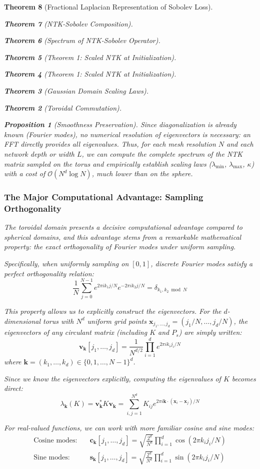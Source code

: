 \documentclass{article}
\newtheorem{theorem}{Theorem}[section]
\newtheorem{proposition}[theorem]{Proposition}
\begin{document}
\begin{theorem}[Fractional Laplacian Representation of Sobolev Loss]
\begin{theorem}[NTK-Sobolev Composition]
\begin{theorem}[Spectrum of NTK-Sobolev Operator]
\begin{theorem}[Theorem 1: Scaled NTK at Initialization]
\begin{theorem}[Theorem 1: Scaled NTK at Initialization]
\begin{theorem}[Gaussian Domain Scaling Laws]
\begin{theorem}[Toroidal Commutation]
\begin{proposition}[Smoothness Preservation]
Since diagonalization is already known (Fourier modes), no numerical resolution of eigenvectors is necessary: an FFT directly provides all eigenvalues. Thus, for each mesh resolution $N$ and each network depth or width $L$, we can compute the complete spectrum of the NTK matrix sampled on the torus and empirically establish scaling laws ($\lambda_{\min}$, $\lambda_{\max}$, $\kappa$) with a cost of $\mathcal{O}(N^{d}\log N)$, much lower than on the sphere.

\subsubsection{The Major Computational Advantage: Sampling Orthogonality}

The toroidal domain presents a decisive computational advantage compared to spherical domains, and this advantage stems from a remarkable mathematical property: the exact orthogonality of Fourier modes under uniform sampling.

Specifically, when uniformly sampling on $[0,1]$, discrete Fourier modes satisfy a perfect orthogonality relation:
\[ \frac{1}{N} \sum_{j=0}^{N-1} e^{2\pi i k_1 j/N} e^{-2\pi i k_2 j/N} = \delta_{k_1, k_2 \bmod N} \]

This property allows us to explicitly construct the eigenvectors. For the $d$-dimensional torus with $N^d$ uniform grid points $\mathbf{x}_{j_1,\ldots,j_d} = (j_1/N, \ldots, j_d/N)$, the eigenvectors of any circulant matrix (including $K$ and $P_s$) are simply written:
\[ \mathbf{v}_{\mathbf{k}}[j_1, \ldots, j_d] = \frac{1}{N^{d/2}} \prod_{i=1}^d e^{2\pi i k_i j_i/N} \]
where $\mathbf{k} = (k_1, \ldots, k_d) \in \{0, 1, \ldots, N-1\}^d$.

Since we know the eigenvectors explicitly, computing the eigenvalues of $K$ becomes direct:
\[ \lambda_{\mathbf{k}}(K) = \mathbf{v}_{\mathbf{k}}^* K \mathbf{v}_{\mathbf{k}} = \sum_{i,j=1}^{N^d} K_{ij} e^{2\pi i \mathbf{k} \cdot (\mathbf{x}_i - \mathbf{x}_j)/N} \]

For real-valued functions, we can work with more familiar cosine and sine modes:
\begin{align}
\text{Cosine modes:} \quad &\mathbf{c}_{\mathbf{k}}[j_1, \ldots, j_d] = \sqrt{\frac{2^d}{N^d}} \prod_{i=1}^d \cos(2\pi k_i j_i/N) \\
\text{Sine modes:} \quad &\mathbf{s}_{\mathbf{k}}[j_1, \ldots, j_d] = \sqrt{\frac{2^d}{N^d}} \prod_{i=1}^d \sin(2\pi k_i j_i/N)
\end{align}


\end{proposition}
\end{theorem}
\end{theorem}
\end{theorem}
\end{theorem}
\end{theorem}
\end{theorem}
\end{theorem}
\end{document}
